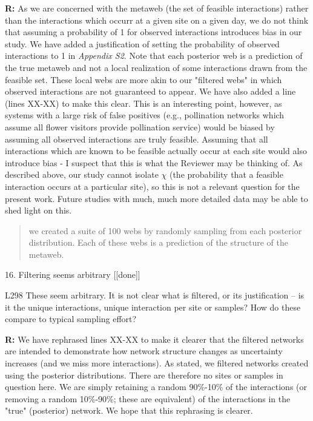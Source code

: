 \documentclass[12pt]{letter}
\newenvironment{refquote}{\bigskip \begin{it}}{\end{it}\smallskip}
\begin{document}
		\textbf{R:} As we are concerned with the metaweb (the set of feasible interactions) rather than the interactions which occurr at a given site on a given day, we do not think that assuming a probability of 1 for observed interactions introduces bias in our study. We have added a justification of setting the probability of observed interactions to 1 in \emph{Appendix S2}. Note that each posterior web is a prediction of the true metaweb and not a local realization of some interactions drawn from the feasible set. These local webs are more akin to our "filtered webs" in which observed interactions are not guaranteed to appear. We have also added a line (lines XX-XX) to make this clear.
		\medskip
		This is an interesting point, however, as systems with a large risk of false positives (e.g., pollination networks which assume all flower visitors provide pollination service) would be biased by assuming all observed interactions are truly feasible. Assuming that all interactions which are known to be feasible actually occur at each site would also introduce bias - I suspect that this is what the Reviewer may be thinking of. As described above, our study cannot isolate $\chi$ (the probability that a feasible interaction occurs at a particular site), so this is not a relevant question for the present work. Future studies with much, much more detailed data may be able to shed light on this.

		\begin{quotation}
			we created a suite of 100 webs by randomly sampling from each posterior distribution. Each of these webs is a prediction of the structure of the metaweb.
		\end{quotation}


	16. Filtering seems arbitrary [[done]]

		\begin{refquote}
		L298 These seem arbitrary. It is not clear what is filtered, or its justification – is it the unique interactions, unique interaction per site or samples? How do these compare to typical sampling effort?
		\end{refquote}

		\textbf{R:} We have rephrased lines XX-XX to make it clearer that the filtered networks are intended to demonstrate how network structure changes as uncertainty increases (and we miss more interactions). As stated, we filtered networks created using the posterior distributions. There are therefore no sites or samples in question here. We are simply retaining a random 90\%-10\% of the interactions (or removing a random 10\%-90\%; these are equivalent) of the interactions in the "true" (posterior) network. We hope that this rephrasing is clearer. 
\end{document}
